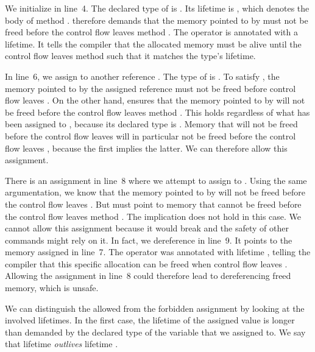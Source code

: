 We initialize  in line~4.
The declared type of  is .
Its lifetime is , which denotes the body of method .
 therefore demands that the memory pointed to by  must not be freed before the control flow leaves method .
The  operator is annotated with a lifetime.
It tells the compiler that the allocated memory must be alive until the control flow leaves method  such that it matches the type's lifetime.

In line~6, we assign  to another reference .
The type of  is .
To satisfy , the memory pointed to by the assigned reference must not be freed before control flow leaves .
On the other hand,  ensures that the memory pointed to by  will not be freed before the control flow leaves method .
This holds regardless of what has been assigned to , because its declared type is .
Memory that will not be freed before the control flow leaves  will in particular not be freed before the control flow leaves , because the first implies the latter.
We can therefore allow this assignment.

There is an assignment in line~8 where we attempt to assign  to .
Using the same argumentation, we know that the memory pointed to by  will not be freed before the control flow leaves .
But  must point to memory that cannot be freed before the control flow leaves method .
The implication does not hold in this case.
We cannot allow this assignment because it would break  and the safety of other commands might rely on it.
In fact, we dereference  in line~9.
It points to the memory assigned in line~7.
The  operator was annotated with lifetime , telling the compiler that this specific allocation can be freed when control flow leaves .
Allowing the assignment in line~8 could therefore lead to dereferencing freed memory, which is unsafe.

We can distinguish the allowed from the forbidden assignment by looking at the involved lifetimes.
In the first case, the lifetime of the assigned value is longer than demanded by the declared type of the variable that we assigned to.
We say that lifetime  \emph{outlives} lifetime .

